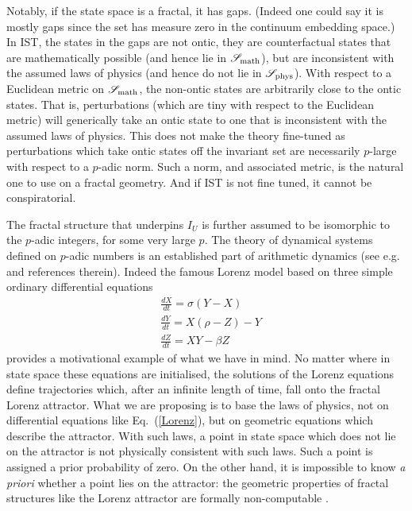 \documentclass{article}
\begin{document}
Notably, if the state space is a fractal, it has gaps. (Indeed one could say it is mostly gaps since the set has measure zero in the continuum embedding space.) In {\sc IST}, the states in the gaps are not ontic, they are counterfactual states that are mathematically possible (and hence lie in ${\mathscr S}_{\rm math}$), but are inconsistent with the assumed laws of physics (and hence do not lie in ${\mathscr S}_{\rm phys}$). With respect to a Euclidean metric on ${\mathscr S}_{\rm math}$, the non-ontic states are arbitrarily close to the ontic states. That is, perturbations (which are tiny with respect to the Euclidean metric) will generically take an ontic state to one that is inconsistent with the assumed laws of physics. This does not make the theory fine-tuned as perturbations which take ontic states off the invariant set are necessarily $p$-large with respect to a $p$-adic norm. Such a norm, and associated metric, is the natural one to use on a fractal geometry. And if {\rm IST} is not fine tuned, it cannot be conspiratorial. 

The fractal structure that underpins $I_U$ is further assumed to be isomorphic to the $p$-adic integers, for some very large $p$. The theory of dynamical systems defined on $p$-adic numbers is an established part of arithmetic dynamics (see e.g. \cite{Woodcock1998padic} and references therein).
Indeed the famous Lorenz model based on three simple ordinary differential equations
\begin{equation}\label{Lorenz}
\begin{split}
&\frac{dX}{dt} = \sigma(Y-X) \\
&\frac{dY}{dt} = X(\rho -Z) -Y\\
&\frac{dZ}{dt} = XY - \beta Z
\end{split}
\end{equation}
provides a motivational example of what we have in mind. No matter where in state space these equations are initialised, the solutions of the Lorenz equations define trajectories which, after an infinite length of time, fall onto the fractal Lorenz attractor. What we are proposing is to base the laws of physics, not on differential equations like Eq.\ (\mbox{\ref{Lorenz}}), but on geometric equations which describe the attractor. With such laws, a point in state space which does not lie on the attractor is not physically consistent with such laws. Such a point is assigned a prior probability of zero. On the other hand, it is impossible to know \textit{a priori} whether a point lies on the attractor: the geometric properties of fractal structures like the Lorenz attractor are formally non-computable \mbox{\cite{blum1998complexity,Dube1993Fractal}}.
\end{document}
